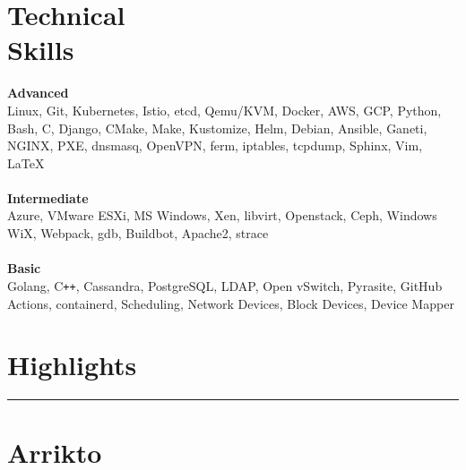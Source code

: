 \documentclass[margin,centered]{res}
\begin{document}
\begin{resume}
\section{\sc Technical\\Skills}
  \textbf{Advanced}\\
  Linux, Git, Kubernetes, Istio, etcd, Qemu/KVM, Docker, AWS, GCP, Python,
  Bash, C, Django, CMake, Make, Kustomize, Helm, Debian, Ansible, Ganeti, NGINX,
  PXE, dnsmasq, OpenVPN, ferm, iptables, tcpdump, Sphinx, Vim, \LaTeX\\\\
  \textbf{Intermediate}\\
  Azure, VMware ESXi, MS Windows, Xen, libvirt, Openstack, Ceph, Windows WiX,
  Webpack, gdb, Buildbot, Apache2, strace\\\\
  \textbf{Basic}\\
  Golang, C\texttt{++}, Cassandra, PostgreSQL, LDAP, Open vSwitch, Pyrasite,
  GitHub Actions, containerd, Scheduling, Network Devices, Block Devices,
  Device Mapper

\pagebreak
\section{Highlights}
\rule[3pt]{\textwidth}{0.4pt}

\section{\sc Arrikto}


\end{resume}
\end{document}
